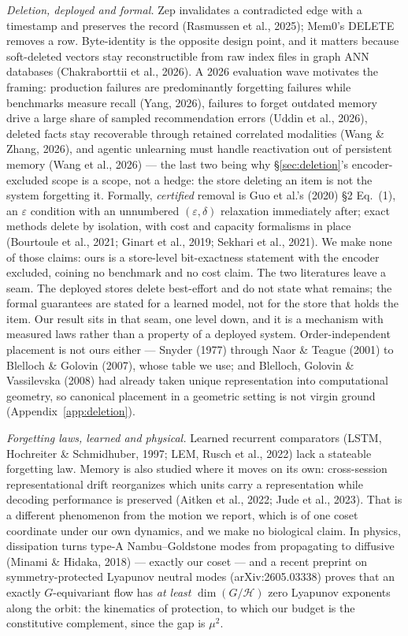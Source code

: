 \documentclass{article}
\begin{document}
{\emph{Deletion, deployed and formal.} Zep invalidates a contradicted edge with a timestamp and preserves the record (Rasmussen et al., 2025); Mem0's DELETE removes a row. Byte-identity is the opposite design point, and it matters because soft-deleted vectors stay reconstructible from raw index files in graph ANN databases (Chakraborttii et al., 2026). A 2026 evaluation wave motivates the framing: production failures are predominantly forgetting failures while benchmarks measure recall (Yang, 2026), failures to forget outdated memory drive a large share of sampled recommendation errors (Uddin et al., 2026), deleted facts stay recoverable through retained correlated modalities (Wang \& Zhang, 2026), and agentic unlearning must handle reactivation out of persistent memory (Wang et al., 2026) --- the last two being why \S\ref{sec:deletion}'s encoder-excluded scope is a scope, not a hedge: the store deleting an item is not the system forgetting it. Formally, \emph{certified} removal is Guo et al.'s (2020) \S2 Eq.~(1), an $\varepsilon$ condition with an unnumbered $(\varepsilon,\delta)$ relaxation immediately after; exact methods delete by isolation, with cost and capacity formalisms in place (Bourtoule et al., 2021; Ginart et al., 2019; Sekhari et al., 2021). We make none of those claims: ours is a store-level bit-exactness statement with the encoder excluded, coining no benchmark and no cost claim. The two literatures leave a seam. The deployed stores delete best-effort and do not state what remains; the formal guarantees are stated for a learned model, not for the store that holds the item. Our result sits in that seam, one level down, and it is a mechanism with measured laws rather than a property of a deployed system. Order-independent placement is not ours either --- Snyder (1977) through Naor \& Teague (2001) to Blelloch \& Golovin (2007), whose table we use; and Blelloch, Golovin \& Vassilevska (2008) had already taken unique representation into computational geometry, so canonical placement in a geometric setting is not virgin ground (Appendix~\ref{app:deletion}).

\emph{Forgetting laws, learned and physical.} Learned recurrent comparators (LSTM, Hochreiter \& Schmidhuber, 1997; LEM, Rusch et al., 2022) lack a stateable forgetting law. Memory is also studied where it moves on its own: cross-session representational drift reorganizes which units carry a representation while decoding performance is preserved (Aitken et al., 2022; Jude et al., 2023). That is a different phenomenon from the motion we report, which is of one coset coordinate under our own dynamics, and we make no biological claim. In physics, dissipation turns type-A Nambu--Goldstone modes from propagating to diffusive (Minami \& Hidaka, 2018) --- exactly our coset --- and a recent preprint on symmetry-protected Lyapunov neutral modes (arXiv:2605.03338) proves that an exactly $G$-equivariant flow has \emph{at least} $\dim(G/\mathcal H)$ zero Lyapunov exponents along the orbit: the kinematics of protection, to which our budget is the constitutive complement, since the gap is $\mu^2$.\par}
\end{document}
